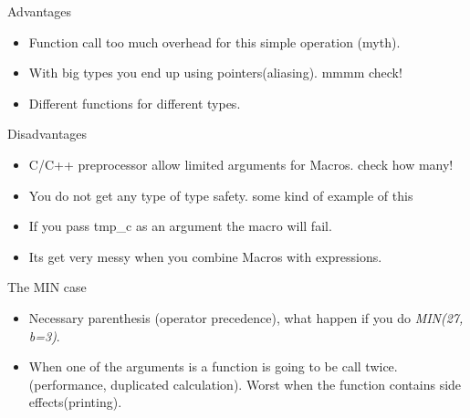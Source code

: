 \begin{frame}{Advantages}
    \begin{itemize}\addtolength{\itemsep}{1\baselineskip}
        \item Function call too much overhead for this simple operation (myth).

        \item With big types you end up using pointers(aliasing).
            {\color{red}mmmm check!}

        \item Different functions for different types.
    \end{itemize}
\end{frame}

\begin{frame}{Disadvantages}
    \begin{itemize}\addtolength{\itemsep}{1\baselineskip}
        \item C/C++ preprocessor allow limited arguments for Macros.
            {\color{red} check how many!}

        \item You do not get any type of type safety.
            {\color{red} some kind of example of this}

        \item If you pass tmp\_c as an argument the macro will fail.

        \item Its get very messy when you combine Macros with expressions.
    \end{itemize}
\end{frame}


\begin{frame}{The MIN case}
    \begin{itemize}\addtolength{\itemsep}{2\baselineskip}
        \item Necessary parenthesis (operator precedence), what happen if you 
            do \emph{MIN(27, b=3)}.

        \item When one of the arguments is a function is going to be call twice. 
            (performance, duplicated calculation). Worst when the function
            contains side effects(printing).
    \end{itemize}
\end{frame}





